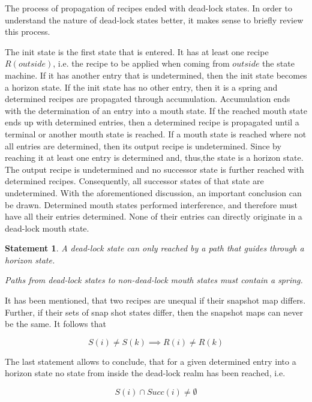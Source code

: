 \documentclass[12pt,a4paper]{scrartcl}
\newtheorem{statement}{Statement}
\begin{document}
The process of propagation of recipes ended with dead-lock states. In order
to understand the nature of dead-lock states better, it makes sense to briefly
review this process. 

The init state is the first state that is entered. It has at least one recipe
$R(outside)$, i.e. the recipe to be applied when coming from $outside$ the
state machine. If it has another entry that is undetermined, then the init
state becomes a horizon state. If the init state has no other entry, then it is
a spring and determined recipes are propagated through accumulation.
Accumulation ends with the determination of an entry into a mouth state. If the
reached mouth state ends up with determined entries, then a determined recipe
is propagated until a terminal or another mouth state is reached. If a mouth
state is reached where not all entries are determined, then its output recipe
is undetermined. Since by reaching it at least one entry is determined and,
thus,the state is a horizon state. The output recipe is undetermined and no
successor state is further reached with determined recipes. Consequently, all
successor states of that state are undetermined.  With the aforementioned
discussion, an important conclusion can be drawn.  Determined mouth states 
performed interference, and therefore must have all their entries determined. 
None of their entries can directly originate in a dead-lock mouth state.

\begin{statement}
A dead-lock state can only reached by a path that guides through a horizon
state. 

Paths from dead-lock states to non-dead-lock mouth states must contain a
spring.
\end{statement}
   
It has been mentioned, that two recipes are unequal if their snapshot map
differs.  Further, if their sets of snap shot states differ, then the snapshot
maps can never be the same. It follows that

\begin{equation}
                   S(i) \neq S(k) \implies R(i) \neq R(k)
\end{equation}

The last statement allows to conclude, that for a given determined entry into a
horizon state no state from inside the dead-lock realm has been reached, i.e.

\begin{equation}
              S(i) \cap Succ(i) \neq \emptyset
\end{equation}
\end{document}
